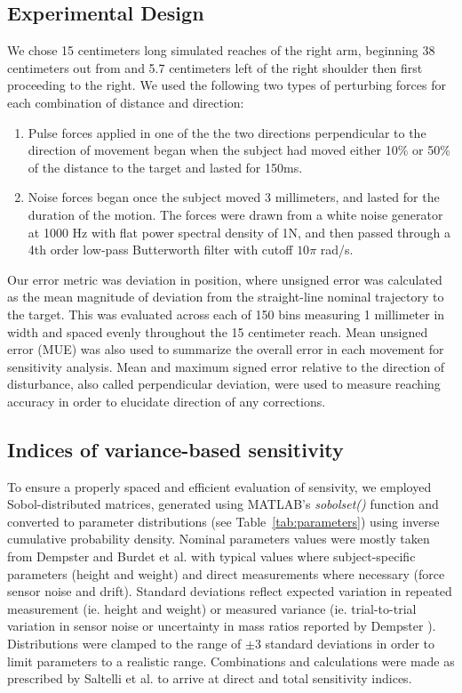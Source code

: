 \subsection*{Experimental Design}
We chose 15 centimeters long simulated reaches of the right arm, beginning 38 centimeters out from and 5.7 centimeters left of the right shoulder then first proceeding to the right.  We used the following two types of perturbing forces for each combination of distance and direction: 
\begin{enumerate}
\item Pulse forces applied in one of the the two directions perpendicular to the direction of movement began when the subject had moved either 10\% or 50\% of the distance to the target and lasted for 150ms.
\item Noise forces began once the subject moved 3 millimeters, and lasted for the duration of the motion. The forces were drawn from a white noise generator at 1000 Hz with flat power spectral density of 1N, and then passed through a 4th order low-pass Butterworth filter with cutoff $10 \pi$ rad/s.
\end{enumerate}
Our error metric was deviation in position, where unsigned error was calculated as the mean magnitude of deviation from the straight-line nominal trajectory to the target. This was evaluated across each of 150 bins measuring 1 millimeter in width and spaced evenly throughout the 15 centimeter reach. Mean unsigned error (MUE) was also used to summarize the overall error in each movement for sensitivity analysis. Mean and maximum signed error relative to the direction of disturbance, also called perpendicular deviation, were used to measure reaching accuracy in order to elucidate direction of any corrections.

\subsection*{Indices of variance-based sensitivity}
To ensure a properly spaced and efficient evaluation of sensivity, we employed Sobol-distributed matrices, generated using MATLAB's \textit{sobolset()} function and converted to parameter distributions (see Table~\ref{tab:parameters}) using inverse cumulative probability density. Nominal parameters values were mostly taken from Dempster \cite{dempster1955space} and Burdet et al. \cite{burdet2006stability} with typical values where subject-specific parameters (height and weight) and direct measurements where necessary (force sensor noise and drift). Standard deviations reflect expected variation in repeated measurement (ie. height and weight) or measured variance (ie. trial-to-trial variation in sensor noise or uncertainty in mass ratios reported by Dempster \cite{dempster1955space}). Distributions were clamped to the range of $\pm3$ standard deviations in order to limit parameters to a realistic range. Combinations and calculations were made as prescribed by Saltelli et al. \cite{saltelli2010variance} to arrive at direct and total sensitivity indices.

